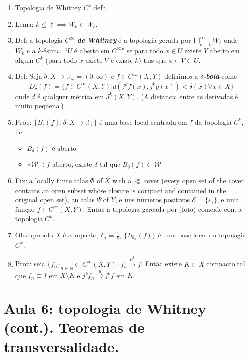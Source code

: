 \begin{enumerate}
\item  Topologia de Whitney \(C^k\) defn.
\item  Lema: \(k \leq  \ell \implies  W_k \subset W_\ell\).
\item Def: a topologia \(C^ \infty\) \textit{\textbf{de Whitney}} é a topologia gerada por \( \bigcup_{k=1}^\infty W_k\) onde \(W_k\) e a \(k\)-ésima. ``\(U\) é aberto em \(C^\infty\)" se para todo \(x\in U\) existe \(V\) aberto em algum \(C^k\) (para todo \(x\) existe \(V\) e existe \(k\)) tais que \(x \in V \subset U\).
\item  Def: Seja \(\delta : X \to \mathbb{R}_+=(0,\infty)\) e \(f \in C^\infty(X,Y)\) definimos a \textit{\textbf{\(\delta\)-bola}} como
	\[D_\delta(f)=\{f \in C^\infty(X,Y)|d(j^kf(x),j^kg(x))<\delta(x)\forall x \in X\}\]
	onde $d$ é qualquer métrica em \(J^k(X,Y)\). {\color{6}(A distancia entre as derivadas é muito pequena.)}
\item Prop: \(\{B_\delta(f): \delta:X \to \mathbb{R}_+\}\) é uma base local centrada em \(f\) da topologia \(C^k\), i.e.
	\begin{itemize}
	\item \(B_\delta(f)\) é aberto.
	\item \(\forall  \mathcal{W} \ni f\) aberto, existe \(\delta\) tal que \(B_\delta(f) \subset \mathcal{W}\).
	\end{itemize}
\item Fix: a locally finite atlas \(\Phi\) of \(X\) with a \(\Subset\) cover (every open set of the cover contains an open subset whose closure is compact and contained in the original open set), an atlas \(\Psi\) of \(Y\), e uns números positivos \(\mathcal{E}=\{ \varepsilon_i\}\), e uma função \(f \in C^\infty(X,Y)\). Então a topologia gereada por (foto) coincide com a topologia \(C^k\).
\item Obs: quando \(X\) é compacto, \(\delta_n=\frac{1}{n}\), \(\{B_{\delta_n}(f)\}\) é uma base local da topologia \(C^k\).
\item Prop: seja \(\{ f_n\}_{n \in \mathbb{N}} \subset C^\infty(X,Y)\), \(f_n \xrightarrow{C^k}f\). Então existe \(K \subset X\) compacto tal que \(f_n \equiv f\) em \(X \setminus K\) e \(j^k f_n \xrightarrow{u}j^kf\) em \(K\).
\end{enumerate}


\section{Aula 6: topologia de Whitney (cont.). Teoremas de transversalidade.}

